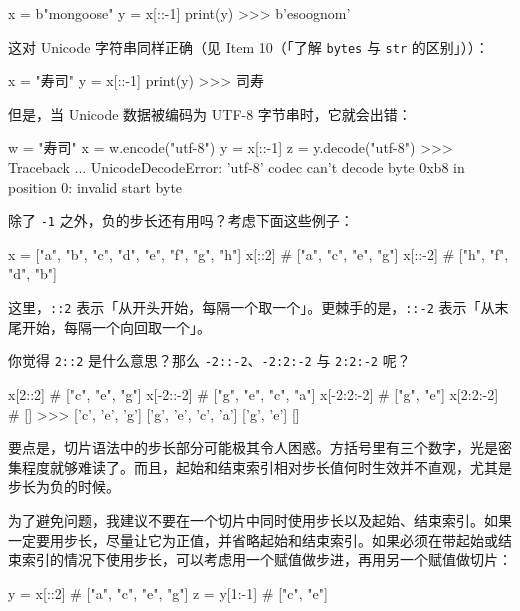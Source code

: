 \begin{codebox}[python]
x = b"mongoose"
y = x[::-1]
print(y)
>>>
b'esoognom'
\end{codebox}

这对 Unicode 字符串同样正确（见 Item 10（「了解 \texttt{bytes} 与 \texttt{str} 的区别」））：

\begin{codebox}[python]
x = "寿司"
y = x[::-1]
print(y)
>>>
司寿
\end{codebox}

但是，当 Unicode 数据被编码为 UTF-8 字节串时，它就会出错：

\begin{codebox}[python]
w = "寿司"
x = w.encode("utf-8")
y = x[::-1]
z = y.decode("utf-8")
>>>
Traceback ...
UnicodeDecodeError: 'utf-8' codec can't decode byte 0xb8 in
position 0: invalid start byte
\end{codebox}

除了 \texttt{-1} 之外，负的步长还有用吗？考虑下面这些例子：

\begin{codebox}[python]
x = ["a", "b", "c", "d", "e", "f", "g", "h"]
x[::2]   # ["a", "c", "e", "g"]
x[::-2]  # ["h", "f", "d", "b"]
\end{codebox}

这里，\texttt{::2} 表示「从开头开始，每隔一个取一个」。更棘手的是，\texttt{::-2} 表示「从末尾开始，每隔一个向回取一个」。

你觉得 \texttt{2::2} 是什么意思？那么 \texttt{-2::-2}、\texttt{-2:2:-2} 与 \texttt{2:2:-2} 呢？

\begin{codebox}[python]
x[2::2]     # ["c", "e", "g"]
x[-2::-2]   # ["g", "e", "c", "a"]
x[-2:2:-2]  # ["g", "e"]
x[2:2:-2]   # []
>>>
['c', 'e', 'g']
['g', 'e', 'c', 'a']
['g', 'e']
[]
\end{codebox}

要点是，切片语法中的步长部分可能极其令人困惑。方括号里有三个数字，光是密集程度就够难读了。而且，起始和结束索引相对步长值何时生效并不直观，尤其是步长为负的时候。

为了避免问题，我建议不要在一个切片中同时使用步长以及起始、结束索引。如果一定要用步长，尽量让它为正值，并省略起始和结束索引。如果必须在带起始或结束索引的情况下使用步长，可以考虑用一个赋值做步进，再用另一个赋值做切片：

\begin{codebox}[python]
y = x[::2]   # ["a", "c", "e", "g"]
z = y[1:-1]  # ["c", "e"]
\end{codebox}

